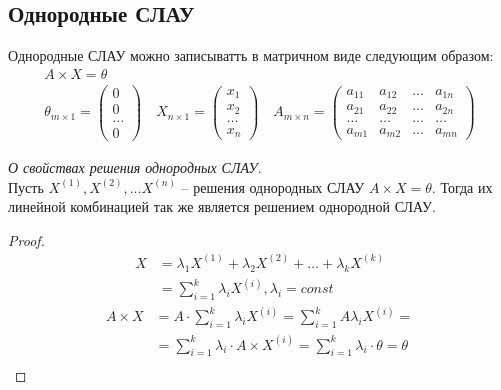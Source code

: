 \subsection{Однородные СЛАУ}

Однородные СЛАУ можно записыватть в матричном виде следующим образом:
\begin{gather*}
  A \times X = \theta \\
  \theta_{m \times 1} = 
  \begin{pmatrix}
    0 \\ 0 \\ \ldots \\ 0
  \end{pmatrix}
  \quad
  X_{n \times 1} = 
  \begin{pmatrix}
    x_1 \\ x_2 \\ \ldots \\ x_{n}
  \end{pmatrix}
  \quad
  A_{m \times n} = 
  \begin{pmatrix}
    a_{11} & a_{12} & \ldots & a_{1n} \\
    a_{21} & a_{22} & \ldots & a_{2n} \\
    \ldots & \ldots & \ldots & \ldots \\
    a_{m1} & a_{m2} & \ldots & a_{mn}
  \end{pmatrix}
\end{gather*}

\begin{theorem}
  \textit{О свойствах решения однородных СЛАУ}. \\
  Пусть $X^{(1)}, X^{(2)}, \ldots X^{(n)}$ -- решения однородных СЛАУ $A \times X = \theta$. Тогда их линейной комбинацией так же является решением однородной СЛАУ.
\end{theorem}
\begin{proof}
  \begin{align*}
    X &= \lambda_1 X^{(1)} + \lambda_2 X^{(2)} + \ldots + \lambda_k X^{(k)} \\
      &= \sum_{i=1}^{k} \lambda_i X^{(i)}, \lambda_i = const
  \end{align*}
  \begin{align*}
    A \times X &= A \cdot \sum_{i=1}^{k}\lambda_i X^{(i)} = \sum_{i=1}^{k} A \lambda_i X^{(i)} = \\
          &= \sum_{i=1}^{k} \lambda_i \cdot A \times X^{(i)} = \sum_{i=1}^{k} \lambda_i \cdot \theta = \theta \\
  \end{align*}
\end{proof}

